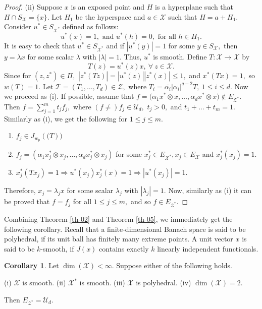 \documentclass{amsart}
\theoremstyle{definition}
\newtheorem{cor}[theorem]{Corollary}
\theoremstyle{remark}
\numberwithin{equation}{section}
\begin{document}
\begin{proof}
(ii) Suppose $x$ is an exposed point and $H$ is a hyperplane such that $H\cap S_{\mathcal{X}}=\{x\}.$ Let $H_1$ be the hyperspace and $a\in \mathcal{X}$ such that $H=a+H_1.$ Consider $u^*\in S_{\mathcal{X}^*}$ defined as follows:
\[u^*(x)=1, \text{ and }u^*(h)=0, \text{ for all } h\in H_1.\] It is easy to check that $u^*\in S_{\mathcal{X}^*}$ and if $|u^*(y)|=1$  for some $y\in S_{\mathcal{X}},$ then $y=\lambda x$ for some scalar $\lambda$ with $|\lambda|=1.$ Thus, $u^*$ is smooth. Define $T:\mathcal{X}\to \mathcal{X}$ by 
\[T(z)=u^*(z) x, ~\forall~z\in \mathcal{X}.\]
Since for $(z,z^*)\in \Pi,$ $|z^*(Tz)|=|u^*(z)||z^*(x)|\leq 1,$ and $x^*(Tx)=1,$ so $w(T)=1.$
Let $\mathcal{T}=(T_1,\ldots,T_d)\in \mathcal{Z},$ where $T_i=\overline{\alpha_i}|\alpha_i|^{q-2}T, ~1\leq i\leq d.$ Now we proceed  as (i). If possible, assume that  $f=\Big(\alpha_1x^*\otimes x,\ldots,\alpha_dx^*\otimes x \Big)\notin E_{\mathcal{Z}^*}.$ Then $f=\sum_{j=1}^mt_jf_j,$ where $(f\neq ) f_j\in \mathcal{U}_d,$ $t_j>0,$ and $t_1+\ldots+t_m=1.$ Similarly as (i), we get the following for $1\leq j\leq m.$
\begin{enumerate}
 \item $f_j\in J_{w_p}(\mathcal(T))$
  \item $f_j=(\alpha_1x_j^*\otimes x_j,\ldots,\alpha_d x_j^*\otimes x_j)$ for some $x_j^*\in E_{\mathcal{X}^*},x_j\in E_{\mathcal{X}}$ and $x_j^*(x_j)=1.$
  \item $x_j^*(Tx_j)=1\Rightarrow u^*(x_j)x_j^*(x)=1\Rightarrow |u^*(x_j)|=1.$
 \end{enumerate}
Therefore, $x_j=\lambda_jx$ for some scalar $\lambda_j$ with $|\lambda_j|=1.$ Now, similarly as (i) it can be proved that $f=f_j$ for all $1\leq j\leq m,$ and so $f\in E_{\mathcal{Z}^*}.$
\end{proof}
Combining Theorem \ref{th-02} and Theorem \ref{th-05}, we immediately get the following corollary. Recall that a finite-dimensional Banach space is said to be polyhedral, if its unit ball has finitely many extreme points.
A unit vector $x$ is said to be $k$-smooth, if $J(x)$ contains exactly $k$ linearly independent functionals.
\begin{cor}\label{cor-11}
		Let $\dim(\mathcal{X})<\infty.$  Suppose either of the following holds.
		\begin{center}
	\rm(i) $\mathcal{X}$ is smooth.
	\rm(ii) $\mathcal{X}^*$ is smooth. 
	\rm(iii) $\mathcal{X}$ is polyhedral.
	\rm(iv) $\dim(\mathcal{X})=2.$
	\end{center}
	Then $E_{\mathcal{Z}^*}= \mathcal{U}_d.$
\end{cor}
\end{document}
